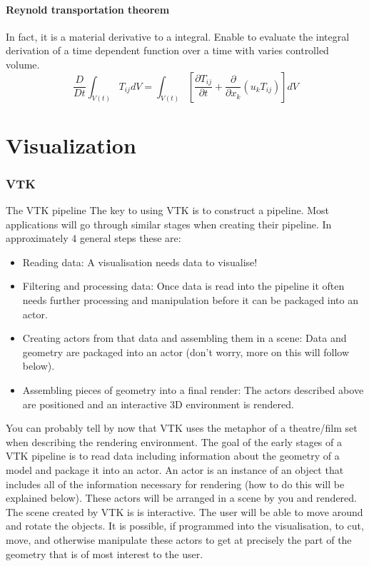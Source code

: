 \documentclass{article}
\begin{document}
\subsection{Reynold transportation theorem}
In fact, it is a material derivative to a integral. Enable to evaluate the integral derivation of a time dependent function over a time with varies controlled volume. 
\begin{equation}
\frac{D}{Dt}\int_{V(t)} T_{ij} dV = \int _{V(t)} \left[ \frac{\partial T_{ij}}{\partial t} + \frac{\partial }{\partial x_k} \left( u_k T_{ij} \right) \right] dV
\end{equation}


\part{Visualization}

\section{VTK}

The VTK pipeline
The key to using VTK is to construct a pipeline. Most applications will go through similar stages when creating their pipeline. In approximately 4 general steps these are:
\begin{itemize}
\item Reading data: A visualisation needs data to visualise!

\item Filtering and processing data: Once data is read into the pipeline it often needs further processing and manipulation before it can be packaged into an actor.

\item  Creating actors from that data and assembling them in a scene: Data and geometry are packaged into an actor (don’t worry, more on this will follow below).

\item  Assembling pieces of geometry into a final render: The actors described above are positioned and an interactive 3D environment is rendered.
\end{itemize}

You can probably tell by now that VTK uses the metaphor of a theatre/film set when describing the rendering environment. The goal of the early stages of a VTK pipeline is to read data including information about the geometry of a model and  package it into an actor. An actor is an instance of an object that includes all of the information necessary for rendering (how to do this will be explained below). These actors will be arranged in a scene by you and rendered. The scene created by VTK is is interactive. The user will be able to move around and rotate the objects. It is possible, if programmed into the visualisation, to cut, move, and otherwise manipulate these actors to get at precisely the part of the geometry that is of most interest to the user.
\end{document}
